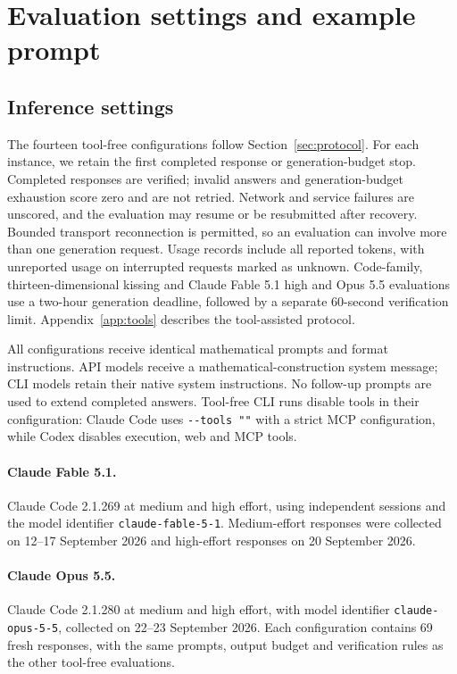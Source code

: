 \appendixpage
\section{Evaluation settings and example prompt}
\label{app:runner}
\subsection{Inference settings}
The fourteen tool-free configurations follow Section~\ref{sec:protocol}. For each instance, we retain the first completed response or generation-budget stop. Completed responses are verified; invalid answers and generation-budget exhaustion score zero and are not retried. Network and service failures are unscored, and the evaluation may resume or be resubmitted after recovery. Bounded transport reconnection is permitted, so an evaluation can involve more than one generation request. Usage records include all reported tokens, with unreported usage on interrupted requests marked as unknown. Code-family, thirteen-dimensional kissing and Claude Fable 5.1 high and Opus 5.5 evaluations use a two-hour generation deadline, followed by a separate 60-second verification limit. Appendix~\ref{app:tools} describes the tool-assisted protocol.

All configurations receive identical mathematical prompts and format instructions. API models receive a mathematical-construction system message; CLI models retain their native system instructions. No follow-up prompts are used to extend completed answers. Tool-free CLI runs disable tools in their configuration: Claude Code uses \verb|--tools ""| with a strict MCP configuration, while Codex disables execution, web and MCP tools.
\paragraph{Claude Fable 5.1.} Claude Code 2.1.269 at medium and high effort, using independent sessions and the model identifier \texttt{claude-fable-5-1}. Medium-effort responses were collected on 12--17 September 2026 and high-effort responses on 20 September 2026.
\paragraph{Claude Opus 5.5.} Claude Code 2.1.280 at medium and high effort, with model identifier \texttt{claude-opus-5-5}, collected on 22--23 September 2026. Each configuration contains 69 fresh responses, with the same prompts, output budget and verification rules as the other tool-free evaluations.
